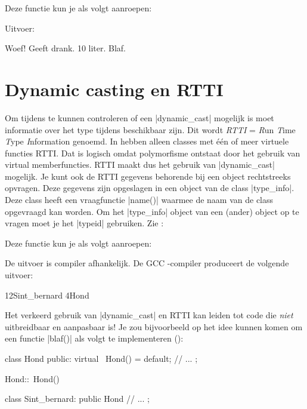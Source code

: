 \begin{cpplstShortInline}
Deze functie kun je als volgt aanroepen:

Uitvoer:
\begin{coutput}
Woef!
Geeft drank.
10 liter.
Blaf.
\end{coutput}

\section{Dynamic casting en RTTI}
Om tijdens  te kunnen controleren of een |dynamic_cast| mogelijk is moet informatie over het type tijdens  beschikbaar zijn.
Dit wordt \emph{RTTI} = \emph{R}un \emph{T}ime \emph{T}ype \emph{I}nformation genoemd.
In \Cpp{} hebben alleen classes met één of meer virtuele functies RTTI.
Dat is logisch omdat polymorfisme ontstaat door het gebruik van virtual memberfuncties.
RTTI maakt dus het gebruik van |dynamic_cast| mogelijk.
Je kunt ook de RTTI gegevens behorende bij een object rechtstreeks opvragen.
Deze gegevens zijn opgeslagen in een object van de class |type_info|.
Deze class heeft een vraagfunctie |name()| waarmee de naam van de class opgevraagd kan worden.
Om het |type_info| object van een (ander) object op te vragen moet je het \Cpp{}  |typeid| gebruiken. Zie :


Deze functie kun je als volgt aanroepen:

De uitvoer is compiler afhankelijk. De GCC \Cpp{}\hyp{}compiler produceert de volgende uitvoer:
\begin{coutput}
12Sint_bernard
4Hond
\end{coutput}

Het verkeerd gebruik van |dynamic_cast| en RTTI kan leiden tot code die \emph{niet} uitbreidbaar en aanpasbaar is! Je zou bijvoorbeeld op het idee kunnen komen om een functie |blaf()| als volgt te implementeren ():
\begin{cpplstfragment}[mathescape=true]
class Hond {
public:
    virtual ~Hond() = default;
//  ...
};

Hond::~Hond() {
}

class Sint_bernard: public Hond {
//  ...
};


\end{cpplstfragment}
\end{cpplstShortInline}
